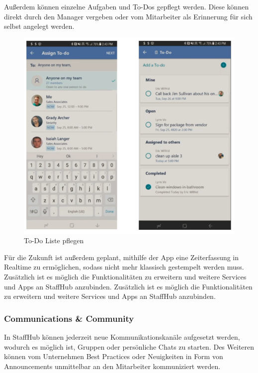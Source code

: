 Außerdem können einzelne Aufgaben und To-Dos gepflegt werden. Diese können direkt durch den Manager vergeben oder vom Mitarbeiter als Erinnerung für sich selbst angelegt werden. 

\begin{figure}[H] 
\centering 
\includegraphics[scale=0.78]{images/todolist} 
\caption[To-Do Liste pflegen]{To-Do Liste pflegen\protect} 
\label{ws} 
\end{figure}

Für die Zukunft ist außerdem geplant, mithilfe der App eine Zeiterfassung in Realtime zu ermöglichen, sodass nicht mehr klassisch gestempelt werden muss.
Zusätzlich ist es möglich die Funktionalitäten zu erweitern und weitere Services und Apps an StaffHub anzubinden. Zusätzlich ist es möglich die Funktionalitäten zu erweitern und weitere Services und Apps an StaffHub anzubinden.

\subsubsection{Communications \& Community}

In StaffHub können jederzeit neue Kommunikationskanäle aufgesetzt werden, wodurch es möglich ist, Gruppen oder persönliche Chats zu starten. Des Weiteren können vom Unternehmen Best Practices oder Neuigkeiten in Form von Announcements unmittelbar an den Mitarbeiter kommuniziert werden.

